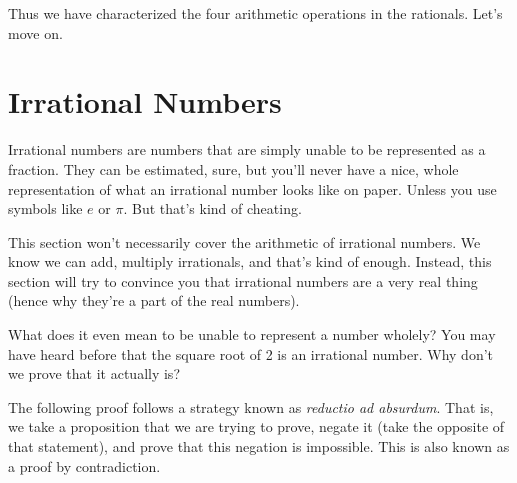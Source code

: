 Thus we have characterized the four arithmetic operations in the rationals. Let's move on.

\section{Irrational Numbers}

Irrational numbers are numbers that are simply unable to be represented as a fraction. They can be estimated, sure, but you'll never have a nice, whole representation of what an irrational number looks like on paper. Unless you use symbols like $e$ or $\pi$. But that's kind of cheating. 

This section won't necessarily cover the arithmetic of irrational numbers. We know we can add, multiply irrationals, and that's kind of enough. Instead, this section will try to convince you that irrational numbers are a very real thing (hence why they're a part of the real numbers). 

What does it even mean to be unable to represent a number wholely? You may have heard before that the square root of 2 is an irrational number. Why don't we prove that it actually is?

The following proof follows a strategy known as \textit{reductio ad absurdum}. That is, we take a proposition that we are trying to prove, negate it (take the opposite of that statement), and prove that this negation is impossible. This is also known as a proof by contradiction. 

